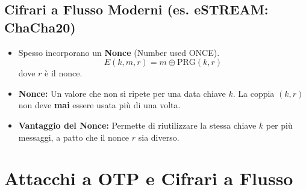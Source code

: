 \documentclass{article}
\begin{document}
\subsection{Cifrari a Flusso Moderni (es. eSTREAM: ChaCha20)}
\begin{itemize}
    \item Spesso incorporano un \textbf{Nonce} (Number used ONCE).
    \[ E(k, m, r) = m \oplus \text{PRG}(k, r) \]
    dove $r$ è il nonce.
    \item \textbf{Nonce:} Un valore che non si ripete per una data chiave $k$. La coppia $(k, r)$ non deve \textbf{mai} essere usata più di una volta.
    \item \textbf{Vantaggio del Nonce:} Permette di riutilizzare la stessa chiave $k$ per più messaggi, a patto che il nonce $r$ sia diverso.
\end{itemize}

\section{Attacchi a OTP e Cifrari a Flusso}
\end{document}
